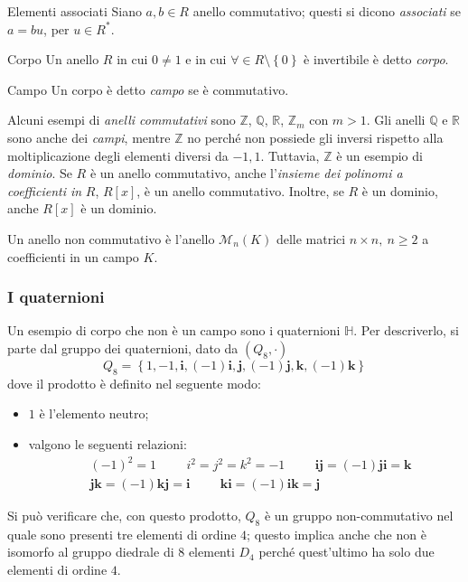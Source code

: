\documentclass[11pt, a4paper]{scrartcl}
\theoremstyle{definition}
\numberwithin{esempio}{section}
\theoremstyle{definition}
\numberwithin{obs}{section}
\numberwithin{nota}{section}
\numberwithin{equation}{subsection}
\begin{document}
\begin{definizione}
	{Elementi associati}{}
	Siano $a,b \in R$ anello commutativo; questi si dicono \textit{associati} se $a = bu$, per $u \in R^*$.
\end{definizione}
\begin{definizione}
	{Corpo}{}
	Un anello $R$ in cui $0\neq 1$ e in cui $\forall  \in R \setminus \left\{ 0 \right\} $ \`e invertibile \`e detto \textit{corpo}.
\end{definizione}
\begin{definizione}
	{Campo}{}
	Un corpo \`e detto \textit{campo} se \`e commutativo.
\end{definizione}
Alcuni esempi di \textit{anelli commutativi} sono $\mathbb{Z}$, $\mathbb{Q}$, $\mathbb{R}$, $\mathbb{Z}_m$ con $m>1$.
Gli anelli $\mathbb{Q}$ e $\mathbb{R}$ sono anche dei \textit{campi}, mentre $\mathbb{Z}$ no perch\'e non possiede gli inversi rispetto alla moltiplicazione degli elementi diversi da $-1,1$.
Tuttavia, $\mathbb{Z}$ \`e un esempio di \textit{dominio}.
Se $R$ \`e un anello commutativo, anche l'\textit{insieme dei polinomi a coefficienti in} $R$, $R[x]$, \`e un anello commutativo.
Inoltre, se $R$ \`e un dominio, anche $R[x]$ \`e un dominio.

Un anello non commutativo \`e l'anello $\mathcal{M} _{n} (K)$ delle matrici $n \times  n, \ n\ge 2$ a coefficienti in un campo $K$.

\subsubsection{I quaternioni}
Un esempio di corpo che non \`e un campo sono i quaternioni $\mathbb{H}$.
Per descriverlo, si parte dal gruppo dei quaternioni, dato da $(Q_8, \cdot )$
\begin{equation}
	Q_8 = \left\{ 1,-1,\mathbf{i} ,(-1)\mathbf{i} , \mathbf{j} , (-1)\mathbf{j}, \mathbf{k} , (-1)\mathbf{k}   \right\} 
\end{equation}
dove il prodotto \`e definito nel seguente modo:
\begin{itemize}
	\item $1$ \`e l'elemento neutro;
	\item valgono le seguenti relazioni:
		\[
			\begin{split}
				&(-1)^2 = 1 \hspace{1cm} i^2 = j^2 = k^2 = -1 \hspace{1cm} \mathbf{i} \mathbf{j} = (-1) \mathbf{j} \mathbf{i} = \mathbf{k}\\
				& \mathbf{jk} = (-1) \mathbf{kj} = \mathbf{i} \hspace{1cm} \mathbf{ki} = (-1) \mathbf{ik} = \mathbf{j} 
			\end{split}
		\] 
\end{itemize}
Si pu\`o verificare che, con questo prodotto, $Q_8$ \`e un gruppo non-commutativo nel quale sono presenti tre elementi di ordine $4$; questo implica anche che non \`e isomorfo al gruppo diedrale di $8$ elementi $D_4$ perch\'e quest'ultimo ha solo due elementi di ordine $4$.
\end{document}
